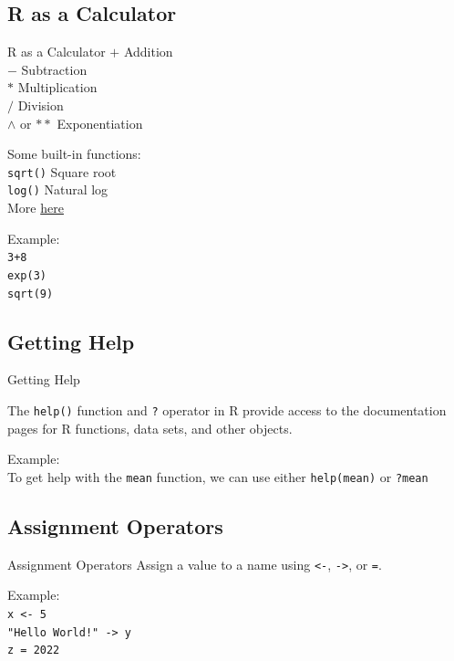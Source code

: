 \documentclass{beamer}
\begin{document}
\subsection{R as a Calculator}
\begin{frame}{R as a Calculator}
$+$ Addition\\
$-$ Subtraction\\
$*$ Multiplication\\
$/$ Division\\
$\wedge$ or $**$ Exponentiation\\
\hfill


Some built-in functions:\\
\texttt{sqrt()} Square root\\
\texttt{log()} Natural log\\
More \href{https://www.javatpoint.com/r-built-in-functions}{here}\\
\hfill

Example:\\

\texttt{3+8}\\
\texttt{exp(3)}\\
\texttt{sqrt(9)}
\end{frame}

\subsection{Getting Help}
\begin{frame}{Getting Help}

The \texttt{help()} function and \texttt{?} operator in R provide access to the documentation pages for R functions, data sets, and other objects.\\
\hfill

Example:\\
To get help with the \texttt{mean} function, we can use either
\texttt{help(mean)}
or 
\texttt{?mean}
    
\end{frame}

\subsection{Assignment Operators}

\begin{frame}{Assignment Operators}
Assign a value to a name using \texttt{<-}, \texttt{->}, or \texttt{=}.\\
\hfill

Example:\\
\texttt{x <- 5}\\
\texttt{"Hello World!" -> y}\\
\texttt{z = 2022}
\end{frame}
\end{document}

